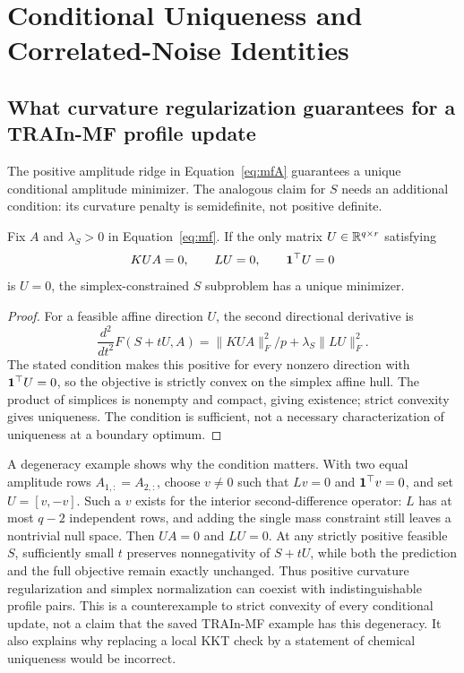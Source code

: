 \section{Conditional Uniqueness and Correlated-Noise Identities}\label{app:auditmath}
\subsection{What curvature regularization guarantees for a TRAIn-MF profile update}
The positive amplitude ridge in Equation~\eqref{eq:mfA} guarantees a unique conditional amplitude minimizer. The analogous claim for $S$ needs an additional condition: its curvature penalty is semidefinite, not positive definite.

\begin{Proposition}\label{prop:mfprofile}
Fix $A$ and $\lambda_S>0$ in Equation~\eqref{eq:mf}. If the only matrix $U\in\mathbb{R}^{q\times r}$ satisfying
\begin{equation}\label{eq:mfprofileunique}
 KUA=0,\qquad LU=0,\qquad\mathbf{1}^\top U=0
\end{equation}
is $U=0$, the simplex-constrained $S$ subproblem has a unique minimizer.
\end{Proposition}
\begin{proof}
For a feasible affine direction $U$, the second directional derivative is
\begin{equation}\label{eq:mfsecondvariation}
 \frac{d^2}{dt^2}F(S+tU,A)=\|KUA\|_F^2/p+\lambda_S\|LU\|_F^2.
\end{equation}
The stated condition makes this positive for every nonzero direction with $\mathbf{1}^\top U=0$, so the objective is strictly convex on the simplex affine hull. The product of simplices is nonempty and compact, giving existence; strict convexity gives uniqueness. The condition is sufficient, not a necessary characterization of uniqueness at a boundary optimum.
\end{proof}

A degeneracy example shows why the condition matters. With two equal amplitude rows $A_{1,:}=A_{2,:}$, choose $v\ne0$ such that $Lv=0$ and $\mathbf{1}^\top v=0$, and set $U=[v,-v]$. Such a $v$ exists for the interior second-difference operator: $L$ has at most $q-2$ independent rows, and adding the single mass constraint still leaves a nontrivial null space. Then $UA=0$ and $LU=0$. At any strictly positive feasible $S$, sufficiently small $t$ preserves nonnegativity of $S+tU$, while both the prediction and the full objective remain exactly unchanged. Thus positive curvature regularization and simplex normalization can coexist with indistinguishable profile pairs. This is a counterexample to strict convexity of every conditional update, not a claim that the saved TRAIn-MF example has this degeneracy. It also explains why replacing a local KKT check by a statement of chemical uniqueness would be incorrect.

